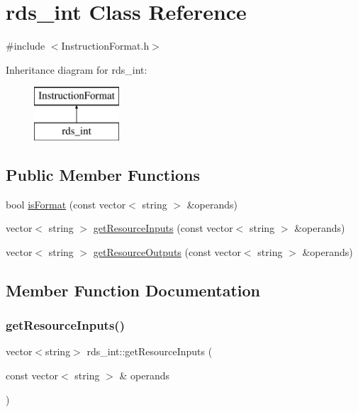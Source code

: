 \hypertarget{classrds__int}{}\section{rds\+\_\+int Class Reference}
\label{classrds__int}


{\ttfamily \#include $<$Instruction\+Format.\+h$>$}

Inheritance diagram for rds\+\_\+int\+:\begin{figure}[H]
\begin{center}
\leavevmode
\includegraphics[height=2.000000cm]{classrds__int}
\end{center}
\end{figure}
\subsection*{Public Member Functions}
\begin{DoxyCompactItemize}
\item 
bool \hyperlink{classrds__int_ac34d1eca9d3ada3e8c2d2b063216d955}{is\+Format} (const vector$<$ string $>$ \&operands)
\item 
vector$<$ string $>$ \hyperlink{classrds__int_a99103f5596a0efdac0644c0a3b29ab8a}{get\+Resource\+Inputs} (const vector$<$ string $>$ \&operands)
\item 
vector$<$ string $>$ \hyperlink{classrds__int_acbcdd1ee4ccce4fab70fc88878b89eb4}{get\+Resource\+Outputs} (const vector$<$ string $>$ \&operands)
\end{DoxyCompactItemize}


\subsection{Member Function Documentation}
\mbox{\label{classrds__int_a99103f5596a0efdac0644c0a3b29ab8a}} 
\subsubsection{\texorpdfstring{get\+Resource\+Inputs()}{getResourceInputs()}}
{\footnotesize\ttfamily vector$<$string$>$ rds\+\_\+int\+::get\+Resource\+Inputs (\begin{DoxyParamCaption}\item[{const vector$<$ string $>$ \&}]{operands }\end{DoxyParamCaption})\hspace{0.3cm}{\ttfamily [virtual]}}

